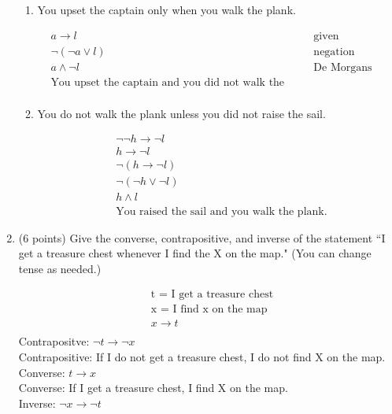 \documentclass[11pt]{article}
\newcommand{\pt}[1]{\textcolor{maincolor}{(#1 points)}}
\begin{document}
\begin{justify}
\begin{enumerate}
\begin{enumerate}
\item You upset the captain only when you walk the plank.
\begin{mdframed}
\begin{align*}
    &a \rightarrow l && \text{given}\\
    &\lnot (\lnot a \lor l) && \text{negation} \\
    &a \land \lnot l && \text{De Morgans Law}\\
    &\text{You upset the captain and you did not walk the plank} \\
\end{align*}
\end{mdframed}
\item You do not walk the plank unless you did not raise the sail.
\begin{mdframed}
\begin{align*}
    &\lnot\lnot h \rightarrow \lnot l\tag{given}\\
    &h \rightarrow \lnot l \tag{double negation} \\
    &\lnot(h \rightarrow \lnot l) \tag{negation}\\
    &\lnot(\lnot h \lor\lnot l) \tag{conditional disjunction law} \\
    &h \land l \tag{de morgans law} \\
    &\text{You raised the sail and you walk the plank.}
\end{align*}
\end{mdframed}
\end{enumerate}
\item \pt{6} Give the converse, contrapositive, and inverse of the statement
``I get a treasure chest whenever I find the X on the map." (You can change tense
as needed.)
\begin{mdframed}
    \begin{align*}
        &\text{t = I get a treasure chest} \\
        &\text{x = I find x on the map} \\
        &x \rightarrow t \tag{given} \\
    \end{align*}
Contrapositve: $\lnot t \rightarrow \lnot x$ \\
Contrapositive: If I do not get a treasure chest, I do not find X on the map. \\
Converse: $t \rightarrow x$ \\
Converse: If I get a treasure chest, I find X on the map. \\
Inverse: $\lnot x \rightarrow \lnot t$ \\

\end{mdframed}
\end{enumerate}
\end{justify}
\end{document}
